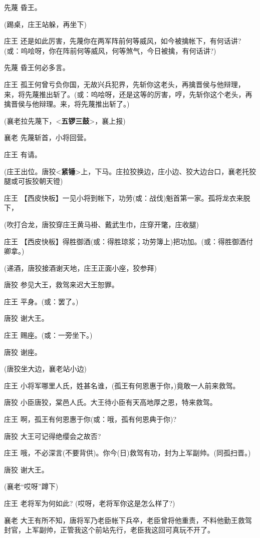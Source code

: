 先蔑 昏王。

(踢桌，庄王站躲，再坐下)

庄王
还是如此厉害，先蔑你在两军阵前何等威风，如今被擒帐下，有何话讲?(或：呜哙呀，你在阵前何等威风，何等煞气，今日被擒，有何话讲?)

先蔑 昏王何必多言。

庄王
孤王何曾亏负你国，无故兴兵犯界，先斩你这老头，再擒晋侯与他辩理，来，将先蔑推出斩了。(或：呜哙呀，还是这等的厉害，哼，先斩你这个老头，再擒晋侯与他辩理。来，将先蔑推出斩了。)

(襄老拉先蔑下，\textless{}\textbf{五锣三鼓}\textgreater{}，襄上报)

襄老 先蔑斩首，小将回营。

庄王 有请。

(庄王出位。唐狡\textless{}\textbf{紧锤}\textgreater{}上，下马。庄拉狡换边，庄小边、狡大边台口，襄老托狡腿或可扳狡朝天镫)

庄王
【西皮快板】一见小将到帐下，功劳(或：战伐)魁首第一家。孤将龙衣来脱下，

(吹打合龙，唐狡穿庄王黄马褂、戴武生巾，庄穿开氅，庄收腿)

庄王
【西皮快板】得胜御酒(或：得胜琼浆；功劳簿上)把功加。(或：得胜御酒付卿拿。)

(递酒，唐狡接酒谢天地，庄王正面小座，狡参拜)

唐狡 参见大王，救驾来迟大王恕罪。

庄王 平身。(或：罢了。)

唐狡 谢大王。

庄王 赐座。(或：一旁坐下。)

唐狡 谢座。

(唐狡坐大边，襄老站小边)

庄王 小将军哪里人氏，姓甚名谁，(孤王有何恩惠于你，)竟敢一人前来救驾。

唐狡 小臣唐狡，棠邑人氏。大王待小臣有天高地厚之恩，特来救驾。

庄王 啊，孤王有何恩惠于你(或：哦，孤有何恩典于你)?

唐狡 大王可记得绝缨会之故否?

庄王
哦，不必深言(不要背供)。你今(日)救驾有功，封为上军副帅。(同孤扫晋。)

唐狡 谢大王。

(襄老``哎呀''蹲下)

庄王 老将军为何如此? (哎呀，老将军你这是怎么样了?)

襄老
大王有所不知，唐将军乃老臣帐下兵卒，老臣曾将他重责，不料他勤王救驾封官，上军副帅，正管我这个前站先行，老臣我这回可真玩不开了。

